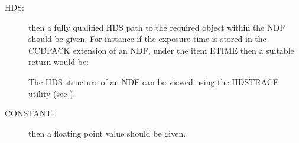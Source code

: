 \documentclass[twoside,11pt,nolof]{starlink}
\begin{document}
{{{        \begin{description}
        \item[HDS:] then a fully qualified HDS path to the required object
          within the NDF should be given. For instance if the exposure
          time is stored in the CCDPACK extension of an NDF, under the
          item ETIME then a suitable return would be:
        The HDS structure of an NDF can be viewed using the HDSTRACE
        utility (see ).

        \item[CONSTANT:] then a floating point value should be given.


\end{description}}}}
\end{document}
